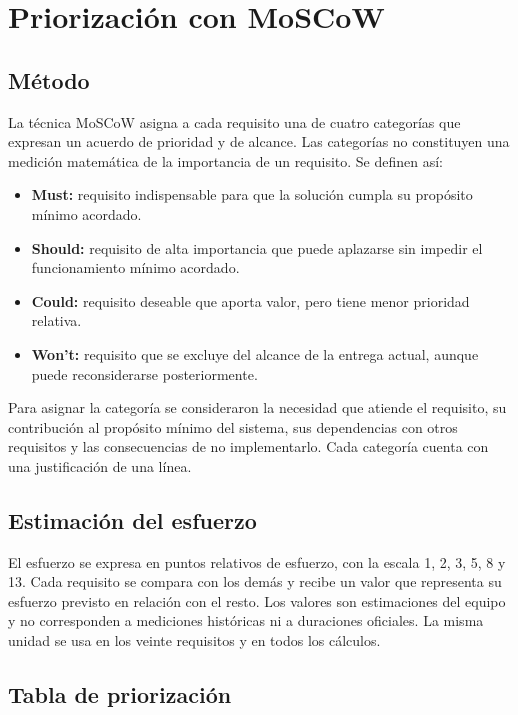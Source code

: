 \section{Priorización con MoSCoW}
\label{sec:moscow}

\subsection{Método}
\label{subsec:moscow-metodo}

La técnica MoSCoW asigna a cada requisito una de cuatro categorías que expresan un acuerdo de prioridad y de alcance. Las categorías no constituyen una medición matemática de la importancia de un requisito. Se definen así:

\begin{itemize}
  \item \textbf{Must:} requisito indispensable para que la solución cumpla su propósito mínimo acordado.
  \item \textbf{Should:} requisito de alta importancia que puede aplazarse sin impedir el funcionamiento mínimo acordado.
  \item \textbf{Could:} requisito deseable que aporta valor, pero tiene menor prioridad relativa.
  \item \textbf{Won't:} requisito que se excluye del alcance de la entrega actual, aunque puede reconsiderarse posteriormente.
\end{itemize}

Para asignar la categoría se consideraron la necesidad que atiende el requisito, su contribución al propósito mínimo del sistema, sus dependencias con otros requisitos y las consecuencias de no implementarlo. Cada categoría cuenta con una justificación de una línea.

\subsection{Estimación del esfuerzo}
\label{subsec:moscow-esfuerzo}

El esfuerzo se expresa en puntos relativos de esfuerzo, con la escala 1, 2, 3, 5, 8 y 13. Cada requisito se compara con los demás y recibe un valor que representa su esfuerzo previsto en relación con el resto. Los valores son estimaciones del equipo y no corresponden a mediciones históricas ni a duraciones oficiales. La misma unidad se usa en los veinte requisitos y en todos los cálculos.

\subsection{Tabla de priorización}
\label{subsec:moscow-tabla}

